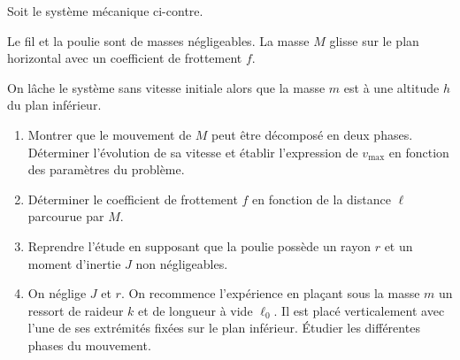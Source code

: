 \documentclass[a4paper,french,bookmarks]{book}
\begin{document}
    \begin{minipage}{0.48\linewidth}
        Soit le système mécanique ci-contre.\newline
        
        Le fil et la poulie sont de masses négligeables. La masse $M$ glisse sur le plan horizontal avec un coefficient de frottement $f$.\medskip
        
        On lâche le système sans vitesse initiale alors que la masse $m$ est à une altitude $h$ du plan inférieur.  
    \end{minipage}
    \hfill
    \begin{minipage}{0.5\linewidth}
        \centering
    \end{minipage}
    
    \begin{enumerate}
        \item Montrer que le mouvement de $M$ peut être décomposé en deux phases. Déterminer l'évolution de sa vitesse et établir l'expression de $v_\text{max}$ en fonction des paramètres du problème.
        
        \item Déterminer le coefficient de frottement $f$ en fonction de la distance $\ell$ parcourue par $M$.
        
        \item Reprendre l'étude en supposant que la poulie possède un rayon $r$ et un moment d'inertie $J$ non négligeables.
        
        \item On néglige $J$ et $r$. On recommence l'expérience en plaçant sous la masse $m$ un ressort de raideur $k$ et de longueur à vide $\ell_0$. Il est placé verticalement avec l'une de ses extrémités fixées sur le plan inférieur. Étudier les différentes phases du mouvement.
    \end{enumerate}
    
\end{document}
